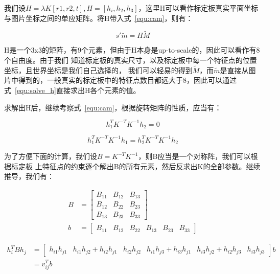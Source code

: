 我们设$H = \lambda K [r1, r2, t], H = [h_i, h_2, h_3]$，这里H可以看作标定板真实平面坐标
与图片坐标之间的单应矩阵。将H带入式~\ref{equ:cam}，则有：

\begin{equation}
	\label{equ:solve_h}
	s' \tilde{m} = H \tilde{M}
\end{equation}

H是一个3x3的矩阵，有9个元素，但由于H本身是up-to-scale的，因此可以看作有8个自由度。由于我们
知道标定板的真实尺寸，以及标定板中每一个特征点的位置坐标，且世界坐标是我们自己选择的，
我们可以轻易的得到$\tilde{M}$，而$\tilde{m}$是直接从图片中得到的，一般真实的标定板中的特征点数目都远大于8，因此可以通过式~\ref{equ:solve_h}直接求出H各个元素的值。

求解出H后，继续考察式~\ref{equ:cam}，根据旋转矩阵的性质，应当有：

\begin{equation}
	\label{equ:const1}
		h_1^T K^{-T} K^{-1} h_2 = 0
\end{equation}

\begin{equation}
	\label{equ:const2}
	h_1^T K^{-T} K^{-1} h_1 = h_2^T K^{-T} K^{-1} h_2
\end{equation}

为了方便下面的计算，我们设$B = K^{-T} K^{-1}$，则B应当是一个对称阵，我们可以根据标定板
上特征点的约束逐个解出B的所有元素，然后反求出K的全部参数。继续推导，我们有：

\begin{equation}
  \begin{aligned}
  	B &=
  	\begin{bmatrix}
  		B_{11} & B_{12} & B_{13} \\
  		B_{12} & B_{22} & B_{23} \\
  		B_{13} & B_{23} & B_{33}
  	\end{bmatrix} \\
  	b &=
  	\begin{bmatrix}
		B_{11} & B_{12} & B_{22} & B_{13} & B_{23} & B_{33}
  	\end{bmatrix}
  \end{aligned}
\end{equation}

\begin{equation}
  \begin{aligned}
  	h_i^T B h_j &= 
  	\begin{bmatrix}
  		h_{i1}h_{j1} & h_{i1}h_{j2} + h_{i2}h_{j1} & h_{i2}h_{j2} &
  		h_{i1}h_{j3} + h_{i3}h_{j1} & h_{i3}h_{j2} + h_{i2}h_{j3} & h_{i3}h_{j3}
  	\end{bmatrix}
  	b \\
  	&= v_{ij}^T b
  \end{aligned}
\end{equation}

